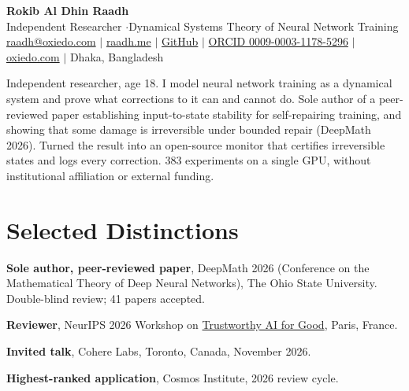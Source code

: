 \documentclass[10pt,a4paper]{article}
\begin{document}
\RaggedRight
\color{body}

\begin{center}
  {\LARGE\bfseries\color{heading} Rokib Al Dhin Raadh}\\[3pt]
  {\small Independent Researcher \enspace$\cdot$\enspace Dynamical Systems Theory of Neural Network Training}\\[3pt]
  {\footnotesize
    \href{mailto:raadh@oxiedo.com}{raadh@oxiedo.com}
    \enspace$|$\enspace
    \href{https://www.raadh.me}{raadh.me}
    \enspace$|$\enspace
    \href{https://github.com/Oxiedo/ormas-monitor}{GitHub}
    \enspace$|$\enspace
    \href{https://orcid.org/0009-0003-1178-5296}{ORCID 0009-0003-1178-5296}
    \enspace$|$\enspace
    \href{https://oxiedo.com}{oxiedo.com}
    \enspace$|$\enspace
    {\color{muted}Dhaka, Bangladesh}
  }
\end{center}
\vspace{1pt}

{\small\noindent Independent researcher, age 18. I model neural network training as a dynamical system and prove what corrections to it can and cannot do. Sole author of a peer-reviewed paper establishing input-to-state stability for self-repairing training, and showing that some damage is irreversible under bounded repair (DeepMath 2026). Turned the result into an open-source monitor that certifies irreversible states and logs every correction. 383 experiments on a single GPU, without institutional affiliation or external funding.\par}

\section*{Selected Distinctions}
\begin{bullets}
  \item \textbf{Sole author, peer-reviewed paper}, DeepMath 2026 (Conference on the Mathematical Theory of Deep Neural Networks), The Ohio State University. Double-blind review; 41 papers accepted.
  \item \textbf{Reviewer}, NeurIPS 2026 Workshop on \href{https://trustworthy-ai-for-good.github.io/}{Trustworthy AI for Good}, Paris, France.
  \item \textbf{Invited talk}, Cohere Labs, Toronto, Canada, November 2026.
  \item \textbf{Highest-ranked application}, Cosmos Institute, 2026 review cycle.
\end{bullets}
\end{document}
